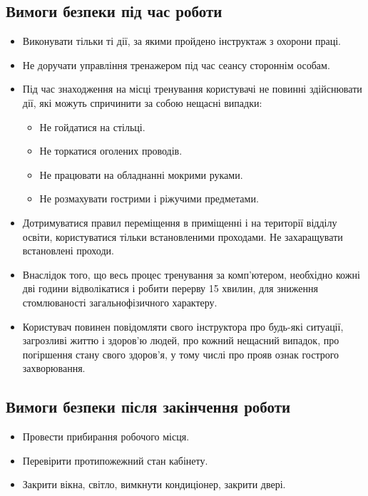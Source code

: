 \subsection{Вимоги безпеки під час роботи}
\begin{itemize}
  \item Виконувати тільки ті дії, за якими пройдено інструктаж з охорони праці.
  \item Не доручати управління тренажером під час сеансу стороннім особам.
  \item Під час знаходження на місці тренування користувачі не повинні здійснювати дії,
    які можуть спричинити за собою нещасні випадки:
    \begin{itemize}
      \item Не гойдатися на стільці.
      \item Не торкатися оголених проводів.
      \item Не працювати на обладнанні мокрими руками.
      \item Не розмахувати гострими і ріжучими предметами.
    \end{itemize}
  \item Дотримуватися правил переміщення в приміщенні і на території відділу освіти,
    користуватися тільки встановленими проходами. Не захаращувати встановлені проходи.
  \item Внаслідок того, що весь процес тренування за комп'ютером, необхідно кожні дві години
    відволікатися і робити перерву 15 хвилин, для зниження стомлюваності
    загальнофізичного характеру.
  \item Користувач повинен повідомляти свого інструктора про будь-які ситуації,
    загрозливі життю і здоров'ю людей, про кожний нещасний випадок,
    про погіршення стану свого здоров'я,
    у тому числі про прояв ознак гострого захворювання.
\end{itemize}
\newpage
\subsection{Вимоги безпеки після закінчення роботи}
\begin{itemize}
  \item Провести прибирання робочого місця.
  \item Перевірити протипожежний стан кабінету.
  \item Закрити вікна, світло, вимкнути кондиціонер, закрити двері.
\end{itemize}
\newpage
